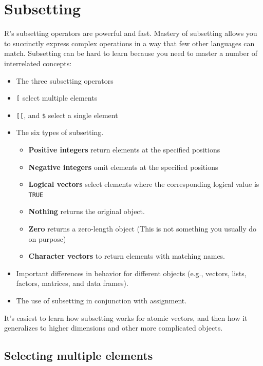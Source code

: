 \documentclass[]{book}
\providecommand{\tightlist}{%
  \setlength{\itemsep}{0pt}\setlength{\parskip}{0pt}}
\theoremstyle{definition}
\theoremstyle{definition}
\theoremstyle{definition}
\theoremstyle{remark}
\begin{document}
\chapter{Subsetting}\label{subsetting}

R's subsetting operators are powerful and fast. Mastery of subsetting
allows you to succinctly express complex operations in a way that few
other languages can match. Subsetting can be hard to learn because you
need to master a number of interrelated concepts:

\begin{itemize}
\item
  The three subsetting operators
\item
  \texttt{{[}} select multiple elements
\item
  \texttt{{[}{[}}, and \texttt{\$} select a single element
\item
  The six types of subsetting.

  \begin{itemize}
  \tightlist
  \item
    \textbf{Positive integers} return elements at the specified
    positions
  \item
    \textbf{Negative integers} omit elements at the specified positions
  \item
    \textbf{Logical vectors} select elements where the corresponding
    logical value is \texttt{TRUE}
  \item
    \textbf{Nothing} returns the original object.
  \item
    \textbf{Zero} returns a zero-length object (This is not something
    you usually do on purpose)
  \item
    \textbf{Character vectors} to return elements with matching names.
  \end{itemize}
\item
  Important differences in behavior for different objects (e.g.,
  vectors, lists, factors, matrices, and data frames).
\item
  The use of subsetting in conjunction with assignment.
\end{itemize}

It's easiest to learn how subsetting works for atomic vectors, and then
how it generalizes to higher dimensions and other more complicated
objects.

\section{Selecting multiple elements}\label{selecting-multiple-elements}
\end{document}
